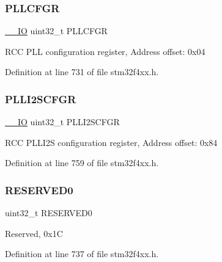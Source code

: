 \subsubsection{\texorpdfstring{P\+L\+L\+C\+F\+GR}{PLLCFGR}}
{\footnotesize\ttfamily \hyperlink{group___c_m_s_i_s__core__definitions_gaec43007d9998a0a0e01faede4133d6be}{\+\_\+\+\_\+\+IO} uint32\+\_\+t P\+L\+L\+C\+F\+GR}

R\+CC P\+LL configuration register, Address offset\+: 0x04 

Definition at line 731 of file stm32f4xx.\+h.

\mbox{\label{struct_r_c_c___type_def_a2d08d5f995ed77228eb56741184a1bb6}} 
\subsubsection{\texorpdfstring{P\+L\+L\+I2\+S\+C\+F\+GR}{PLLI2SCFGR}}
{\footnotesize\ttfamily \hyperlink{group___c_m_s_i_s__core__definitions_gaec43007d9998a0a0e01faede4133d6be}{\+\_\+\+\_\+\+IO} uint32\+\_\+t P\+L\+L\+I2\+S\+C\+F\+GR}

R\+CC P\+L\+L\+I2S configuration register, Address offset\+: 0x84 

Definition at line 759 of file stm32f4xx.\+h.

\mbox{\label{struct_r_c_c___type_def_af86c61a5d38a4fc9cef942a12744486b}} 
\subsubsection{\texorpdfstring{R\+E\+S\+E\+R\+V\+E\+D0}{RESERVED0}}
{\footnotesize\ttfamily uint32\+\_\+t R\+E\+S\+E\+R\+V\+E\+D0}

Reserved, 0x1C 

Definition at line 737 of file stm32f4xx.\+h.

\mbox{\label{struct_r_c_c___type_def_a28d88d9a08aab1adbebea61c42ef901e}} 
